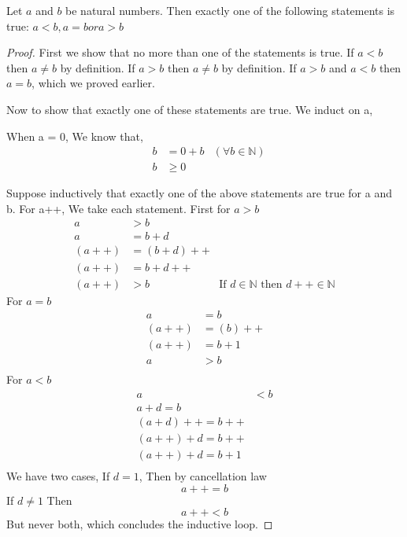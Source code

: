 \documentclass[11pt]{report}
\begin{document}
\begin{prop}
Let $a$ and $b$ be natural numbers. Then exactly one of the following statements is true: $a<b, a=b or a>b$
\end{prop}
\begin{proof}
First we show that no more than one of the statements is true.
If $a<b$ then $a \neq b$ by definition. If $a>b$ then $a \neq b$ by definition. If $a>b$ and $a<b$ then $a=b$, which we proved earlier.

Now to show that exactly one of these statements are true.
We induct on a,

When a = 0,
We know that,
\begin{align*}
&b &= 0 + b &(\forall b \in \mathbb{N})\\
&b &\geq 0
\end{align*}

Suppose inductively that exactly one of the above statements are true for a and b.
For a++,
We take each statement. First for $a>b$
\begin{align*}
a &> b \\
a &= b + d \\
(a++) &= (b + d)++ \\
(a++) &= b + d++ \\
(a++) &> b &\text{If $d \in \mathbb{N}$ then $d++ \in \mathbb{N}$}
\end{align*}
For $a=b$
\begin{align*}
a &= b \\
(a++) &= (b)++ \\
(a++) &= b + 1 \\
a &> b \\
\end{align*}
For $a<b$
\begin{align*}
a &<b\\
a + d = b \\
(a + d)++ = b++ \\
(a++) + d = b++ \\
(a++) + d = b + 1 \\
\end{align*}
We have two cases,
If $d = 1$,
Then by cancellation law
$$ a++ = b $$
If $d \neq 1$
Then
$$a++ < b$$
But never both, which concludes the inductive loop.
\end{proof}
\end{document}
